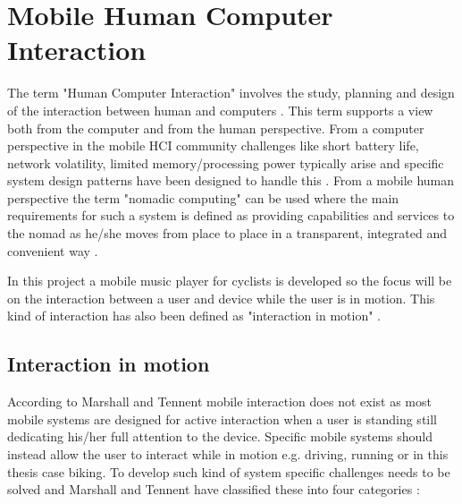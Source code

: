 \section{Mobile Human Computer Interaction}
The term "Human Computer Interaction" involves the study, planning and design of the interaction between human and computers \cite{card_psychology_1983}. This term supports a view both from the computer and from the human perspective. From a computer perspective in the mobile HCI community challenges like short battery life, network volatility, limited memory/processing power typically arise and specific system design patterns have been designed to handle this \cite{roth_patterns_2002}. From a mobile human perspective the term "nomadic computing" can be used where the main requirements for such a system is defined as providing capabilities and services to the nomad as he/she moves from place to place in a transparent, integrated and convenient way \cite{sawhney_nomadic_2000}.

In this project a mobile music player for cyclists is developed so the focus will be on the interaction between a user and device while the user is in motion. This kind of interaction has also been defined as "interaction in motion" \cite{marshall_mobile_2013}.

\subsection{Interaction in motion}
\label{sec:interactioninmotion}
According to Marshall and Tennent \cite{marshall_mobile_2013} mobile interaction does not exist as most mobile systems are designed for active interaction when a user is standing still dedicating his/her full attention to the device. Specific mobile systems should instead allow the user to interact while in motion e.g. driving, running or in this thesis case biking. To develop such kind of system specific challenges needs to be solved and Marshall and Tennent have classified these into four categories \cite{marshall_mobile_2013}:

